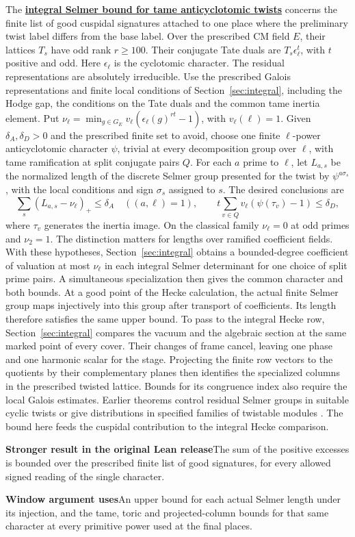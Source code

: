 \documentclass[11pt,a4paper]{article}
\newcommand{\rhscopelabel}[2]{%
  {\setlength{\fboxsep}{2pt}\colorbox{#1}{%
    \small\sffamily\bfseries\color{PageInk}#2}}}
\newcommand{\rhrange}[3][Stronger result in the original Lean release]{%
  \par\addvspace{.45\baselineskip}\Needspace{4\baselineskip}%
  \begingroup\setlength{\leftskip}{.65em}\setlength{\parindent}{0pt}%
  \noindent\rhscopelabel{TraceTint}{#1}\enspace#2\par
  \nobreak\smallskip
  \noindent\rhscopelabel{FieldTint}{Window argument uses}\enspace#3\par
  \endgroup\addvspace{.45\baselineskip}}
\begin{document}
The \textbf{\hyperlink{candidate.tame-selmer}{integral Selmer bound for tame
anticyclotomic twists}} concerns the finite list of good cuspidal
signatures attached to one place where the preliminary twist label
differs from the base label. Over the prescribed CM field \(E\), their
lattices \(T_s\) have odd rank \(r\ge100\).
Their conjugate Tate duals are \(T_s\epsilon_\ell^t\), with \(t\)
positive and odd. Here \(\epsilon_\ell\) is the cyclotomic character.
The residual representations are absolutely irreducible. Use the
prescribed Galois representations and finite local conditions of
Section~\ref{sec:integral}, including the Hodge gap, the conditions
on the Tate duals and the common tame inertia element. Put
\(\nu_\ell=\min_{g\in G_E}v_\ell(\epsilon_\ell(g)^{rt}-1)\), with
\(v_\ell(\ell)=1\). Given \(\delta_A,\delta_D>0\) and the prescribed
finite set to avoid, choose one finite \(\ell\)-power anticyclotomic
character \(\psi\), trivial at every decomposition group over
\(\ell\), with tame ramification at split conjugate pairs \(Q\).
For each \(a\) prime to \(\ell\), let \(L_{a,s}\) be the normalized
length of the discrete Selmer group presented for the twist by
\(\psi^{a\sigma_s}\), with the local conditions and sign \(\sigma_s\)
assigned to \(s\).
The desired conclusions are
\[
  \sum_s (L_{a,s}-\nu_\ell)_+ \le \delta_A
       \quad ((a,\ell)=1),\qquad
  t\sum_{v\in Q}v_\ell(\psi(\tau_v)-1)\le\delta_D ,
\]
where \(\tau_v\) generates the inertia image. On the classical family
\(\nu_\ell=0\) at odd primes and \(\nu_2=1\). The distinction matters
for lengths over ramified coefficient fields. With these hypotheses,
Section~\ref{sec:integral} obtains a bounded-degree coefficient of
valuation at most \(\nu_\ell\) in each integral Selmer determinant
for one choice of split prime pairs. A simultaneous specialization
then gives the common character and both bounds. At a good point of
the Hecke calculation, the actual finite Selmer group maps injectively
into this group after transport of coefficients. Its length therefore
satisfies the same upper bound. To pass to the
integral Hecke row, Section~\ref{sec:integral} compares the vacuum
and the algebraic section at the same marked point of every cover.
Their changes of frame cancel, leaving one phase and one harmonic
scalar for the stage. Projecting the finite row vectors to the
quotients by their complementary planes then identifies the
specialized columns in the prescribed twisted lattice. Bounds for
its congruence index also require the local Galois estimates. Earlier
theorems control residual Selmer groups in suitable cyclic twists or
give distributions in specified families of twistable modules
\cite{tame-selmer-mazur-rubin,tame-selmer-smith}. The bound here feeds
the cuspidal contribution to the integral Hecke comparison.
\rhrange{The sum of the positive excesses is bounded over the
prescribed finite list of good signatures, for every allowed signed
reading of the single character.}
{An upper bound for each actual Selmer length under its injection,
and the tame, toric and projected-column bounds for that same
character at every primitive power used at the final places.}
\end{document}
